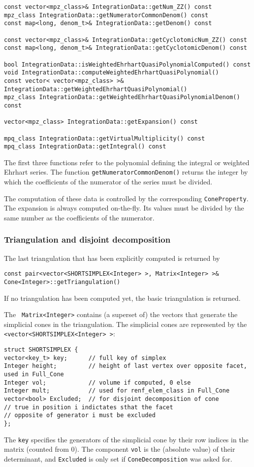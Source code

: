\documentclass[12pt,a4paper]{scrartcl}
\theoremstyle{definition}
\begin{document}
\begin{small}
\begin{Verbatim}
const vector<mpz_class>& IntegrationData::getNum_ZZ() const
mpz_class IntegrationData::getNumeratorCommonDenom() const
const map<long, denom_t>& IntegrationData::getDenom() const

const vector<mpz_class>& IntegrationData::getCyclotomicNum_ZZ() const
const map<long, denom_t>& IntegrationData::getCyclotomicDenom() const

bool IntegrationData::isWeightedEhrhartQuasiPolynomialComputed() const
void IntegrationData::computeWeightedEhrhartQuasiPolynomial()
const vector< vector<mpz_class> >& IntegrationData::getWeightedEhrhartQuasiPolynomial()
mpz_class IntegrationData::getWeightedEhrhartQuasiPolynomialDenom() const

vector<mpz_class> IntegrationData::getExpansion() const

mpq_class IntegrationData::getVirtualMultiplicity() const
mpq_class IntegrationData::getIntegral() const
\end{Verbatim}

The first three functions refer to the polynomial defining the integral or weighted Ehrhart series. The function \verb|getNumeratorCommonDenom()| returns the integer by which the coefficients of the numerator of the series must be divided.

The computation of these data is controlled by the corresponding \verb|ConeProperty|. The expansion is always  computed on-the-fly. Its values must be divided by the same number as the coefficients of the numerator.

\subsubsection{Triangulation and disjoint decomposition}

The last triangulation that has been explicitly computed is returned by 
\begin{Verbatim}
const pair<vector<SHORTSIMPLEX<Integer> >, Matrix<Integer> >&
Cone<Integer>::getTriangulation()
\end{Verbatim}
If no triangulation has been computed yet, the basic triangulation is returned.

The \verb| Matrix<Integer>| contains (a superset of) the vectors that generate the simplicial cones in the triangulation. The simplicial cones are represented by the \verb|<vector<SHORTSIMPLEX<Integer> >|:
\begin{Verbatim}
struct SHORTSIMPLEX {
vector<key_t> key;      // full key of simplex
Integer height;         // height of last vertex over opposite facet, used in Full_Cone
Integer vol;            // volume if computed, 0 else
Integer mult;           // used for renf_elem_class in Full_Cone
vector<bool> Excluded;  // for disjoint decomposition of cone
// true in position i indictates sthat the facet
// opposite of generator i must be excluded
};
\end{Verbatim}
The \verb|key| specifies the generators of the simplicial cone by their row indices in the matrix (counted from $0$). The component \verb|vol| is the (absolute value) of their determinant, and \verb|Excluded| is only set if \verb|ConeDecomposition| was asked for.


\end{small}
\end{document}
